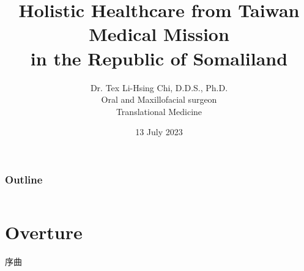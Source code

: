 \documentclass[aspectratio=169]{beamer}
\title{Holistic Healthcare from Taiwan Medical Mission \\ in the Republic of Somaliland}
\author{Dr. Tex Li-Hsing Chi, D.D.S., Ph.D. \\
        Oral and Maxillofacial surgeon \\
        Translational Medicine}
\institute{Wanfang Hospital, managed by Taipei Medical University}
\date{13 July 2023}
\begin{document}


\begin{frame}
\titlepage
\end{frame}

\begin{frame}
\frametitle{Outline}

\begin{columns}
\tableofcontents



\end{columns}


\end{frame}


\section{Overture}

\begin{frame}{序曲}
    \begin{center}
        
    \end{center}
\end{frame}
\end{document}
